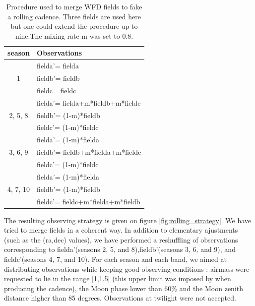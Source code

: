 \documentclass[\docopts]{\docclass}
\newcommand{\fia}{fielda}
\newcommand{\fib}{fieldb}
\newcommand{\fic}{fieldc}
\newcommand{\fiap}{fielda'}
\newcommand{\fibp}{fieldb'}
\newcommand{\ficp}{fieldc'}
\begin{document}
\begin{table}[t]
\begin{center}
\caption{Procedure used to merge WFD fields to fake a rolling
  cadence. Three fields are used here but one could extend the
  procedure up to nine.The mixing rate m was set to 0.8.}
\label{tab:rolling_cadence}
\begin{tabular}{c|l}
\hline
\hline
    season   &      Observations \\
\hline
       & \fiap = \fia \\
    1 & \fibp = \fib \\
       & \fic = \fic \\
\hline
               & \fiap = \fia+m*\fib+m*\fic \\
    2, 5, 8 & \fibp = (1-m)*\fib \\
               & \ficp = (1-m)*\fic \\
\hline
               & \fiap = (1-m)*\fia \\
    3, 6, 9 & \fibp = \fib +m*\fia+m*\fic\\
              & \ficp = (1-m)*\fic \\
\hline
                 & \fiap = (1-m)*\fia\\
    4, 7, 10 & \fibp = (1-m)*\fib \\
                 & \ficp = \fic +m*\fia+m*\fib\\
\hline
\end{tabular}
\end{center}
\end{table}

The resulting observing strategy is given on figure
\ref{fig:rolling_strategy}. We have tried to merge fields in a coherent way. In addition to
elementary ajustments (such as the (ra,dec) values), we have performed
a reshuffling of observations corresponding to \fiap (seasons 2, 5,
and 8),\fibp (seasons 3, 6, and 9), and \ficp (seasons 4, 7, and
10). For each season and each band, we aimed at distributing
observations while keeping good observing conditions : airmass were
requested to lie in the range [1,1.5] (this upper limit was imposed by 
when producing the  cadence), the Moon phase lower
than 60\% and the Moon zenith distance higher than 85 degrees. Observations at twilight were not accepted.
\end{document}
